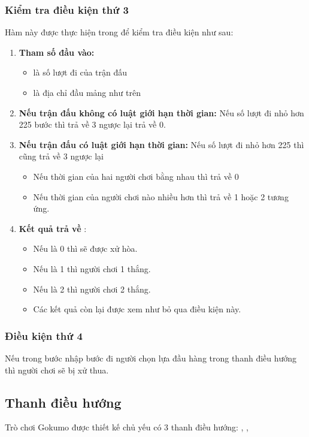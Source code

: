 \subsubsection{Kiểm tra điều kiện thứ 3}
Hàm  này được thực hiện trong  để kiểm tra điều kiện như sau:
\begin{enumerate}
   \item \textbf{Tham số đầu vào:}
   \begin{itemize}
      \item {} là số lượt đi của trận đấu 
      \item {} là địa chỉ đầu mảng  như trên
   \end{itemize}
   \item \textbf{Nếu trận đấu không có luật giới hạn thời gian:} Nếu số lượt đi  nhỏ hơn 225 bước thì trả về 3 ngược lại trả về 0.
   \item \textbf{Nếu trận đấu có luật giới hạn thời gian:} Nếu số lượt đi nhỏ hơn 225 thì cũng trả về 3 ngược lại
   \begin{itemize}
      \item Nếu thời gian của hai người chơi bằng nhau thì trả về 0
      \item Nếu thời gian của người chơi nào nhiều hơn thì trả về 1 hoặc 2 tương ứng. 
   \end{itemize}
   \item \textbf{Kết quả trả về} :
   \begin{itemize}
      \item Nếu là 0 thì sẽ được xử hòa.
      \item Nếu là 1 thì người chơi 1 thắng.
      \item Nếu là 2 thì người chơi 2 thắng.
      \item Các kết quả còn lại được xem như bỏ qua điều kiện này.
   \end{itemize}
   
\end{enumerate}

\subsubsection{Điều kiện thứ 4}
Nếu trong bước nhập bước đi người chọn lựa đầu hàng trong thanh điều hướng  thì người chơi sẽ bị xử thua.

\subsection{Thanh điều hướng}
Trò chơi Gokumo được thiết kế chủ yếu có 3 thanh điều hướng: , ,  
